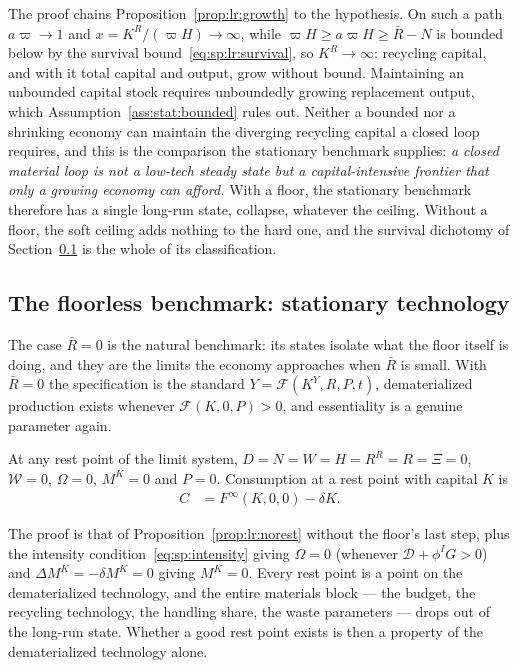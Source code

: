 The proof chains Proposition~\ref{prop:lr:growth} to the hypothesis. On such a path $a\varpi\to1$ and $x=K^R/\left(\varpi H\right)\to\infty$, while $\varpi H\ge a\varpi H\ge\bar R-N$ is bounded below by the survival bound~\eqref{eq:sp:lr:survival}, so $K^R\to\infty$: recycling capital, and with it total capital and output, grow without bound. Maintaining an unbounded capital stock requires unboundedly growing replacement output, which Assumption~\ref{ass:stat:bounded} rules out. Neither a bounded nor a shrinking economy can maintain the diverging recycling capital a closed loop requires, and this is the comparison the stationary benchmark supplies: \emph{a closed material loop is not a low-tech steady state but a capital-intensive frontier that only a growing economy can afford.} With a floor, the stationary benchmark therefore has a single long-run state, collapse, whatever the ceiling. Without a floor, the soft ceiling adds nothing to the hard one, and the survival dichotomy of Section~\ref{sec:sp:longrun:restpoints} is the whole of its classification.

\subsection{The floorless benchmark: stationary technology}\label{sec:sp:longrun:restpoints}

The case $\bar R=0$ is the natural benchmark: its states isolate what the floor itself is doing, and they are the limits the economy approaches when $\bar R$ is small. With $\bar R=0$ the specification is the standard $Y=\mathcal F\left(K^Y,R,P,t\right)$, dematerialized production exists whenever $\mathcal F\left(K,0,P\right)>0$, and essentiality is a genuine parameter again.

\begin{lemma}\label{lem:lr:autarky}
At any rest point of the limit system, $D=N=W=H=R^R=R=\Xi=0$, $\mathcal W=0$, $\Omega=0$, $M^K=0$ and $P=0$. Consumption at a rest point with capital $K$ is
\begin{align}
C &= F^\infty\left(K,0,0\right)-\delta K .
\label{eq:sp:lr:restC}
\end{align}
\end{lemma}

The proof is that of Proposition~\ref{prop:lr:norest} without the floor's last step, plus the intensity condition~\eqref{eq:sp:intensity} giving $\Omega=0$ (whenever $\mathcal D+\phi^IG>0$) and $\Delta M^K=-\delta M^K=0$ giving $M^K=0$. Every rest point is a point on the dematerialized technology, and the entire materials block --- the budget, the recycling technology, the handling share, the waste parameters --- drops out of the long-run state. Whether a good rest point exists is then a property of the dematerialized technology alone.

